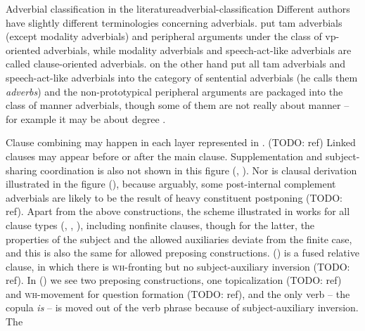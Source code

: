 \documentclass[UTF8, a4paper, oneside, scheme=plain, 12pt]{ctexbook}
\newcommand*{\citepage}[1]{p.~{#1}}
\newcommand*{\term}[1]{\emph{#1}}
\newcommand{\form}[1]{\emph{#1}}
\newcommand{\formcat}[1]{\textsc{#1}}
\begin{document}
\begin{infobox}{Adverbial classification in the literature}{adverbial-classification}
    Different authors have slightly different terminologies concerning adverbials.
    \citet[\citepage{576}]{cgel} put \acs{tam} adverbials (except modality adverbials) 
    and peripheral arguments
    under the class of \acs{vp}-oriented adverbials, 
    while modality adverbials and speech-act-like adverbials are called clause-oriented adverbials.
    \citet[\citepage{386}]{dixon2005semantic} on the other hand 
    put all \acs{tam} adverbials and speech-act-like adverbials 
    into the category of sentential adverbials (he calls them \term{adverbs})
    and the non-prototypical peripheral arguments are packaged into the class of manner adverbials,
    though some of them are not really about manner -- 
    for example it may be about degree \citet[\citepage{576}]{cgel}.
\end{infobox}

Clause combining may happen in each layer represented in . (TODO: ref)
Linked clauses may appear before or after the main clause.
Supplementation and subject-sharing coordination is also not shown in this figure 
(,
).
Nor is clausal derivation illustrated in the figure 
(),
because arguably, some post-internal complement adverbials 
are likely to be the result of heavy constituent postponing (TODO: ref).
Apart from the above constructions,
the scheme illustrated in  works for all clause types
(, 
,
),
including nonfinite clauses,
though for the latter,
the properties of the subject 
and the allowed auxiliaries deviate from the finite case,
and this is also the same for allowed preposing constructions. %
() is a fused relative clause,
in which there is \formcat{wh}-fronting 
but no subject-auxiliary inversion (TODO: ref).
In () we see two preposing constructions,
one topicalization (TODO: ref)
and \formcat{wh}-movement for question formation (TODO: ref),
and the only verb -- the copula \form{is} -- is moved out of the verb phrase
because of subject-auxiliary inversion.
The 
\end{document}
